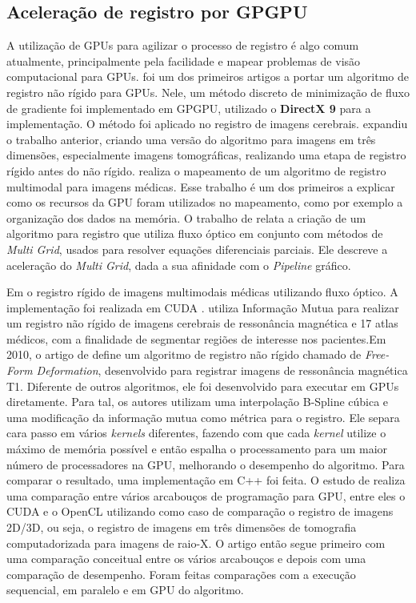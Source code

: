 \subsection{Aceleração de registro por GPGPU}

  A utilização de GPUs para agilizar o processo de registro é algo comum
atualmente, principalmente pela facilidade e mapear problemas de visão
computacional para GPUs. \cite{strzodka2004image} foi um dos primeiros artigos
a portar um algoritmo de registro não rígido para GPUs. Nele, um método discreto
de minimização de fluxo de gradiente foi implementado em GPGPU, utilizado o
\textbf{DirectX 9} para a implementação. O método foi aplicado no registro
de imagens cerebrais. \cite{kohn2006gpu} expandiu o trabalho
anterior, criando uma versão do algoritmo para imagens em três dimensões, 
especialmente imagens tomográficas, realizando uma etapa de registro rígido antes 
do não rígido. \cite{vetter2007non} realiza o mapeamento de um algoritmo de 
registro multimodal para imagens médicas. Esse trabalho é um dos primeiros a 
explicar como os recursos da GPU foram utilizados no mapeamento, como por 
exemplo a organização dos dados na memória. O trabalho de \cite{grossauer2008gpu} 
relata a criação de um algoritmo para registro que utiliza fluxo óptico em conjunto 
com métodos de \textit{Multi Grid}, usados para resolver equações diferenciais 
parciais. Ele descreve a aceleração do \textit{Multi Grid}, dada a sua 
afinidade com o \textit{Pipeline} gráfico.

  Em \cite{bui2009performance} o registro rígido de imagens multimodais médicas
utilizando fluxo óptico. A implementação foi realizada em CUDA
\cite{nvidia2007compute}. \cite{han2009gpu} utiliza Informação Mutua para
realizar um registro não rígido de imagens cerebrais de ressonância magnética
e 17 atlas médicos, com a finalidade de segmentar regiões de interesse nos
pacientes.Em 2010, o artigo de \cite{modat2010fast} define um algoritmo de
registro não rígido chamado de \textit{Free-Form Deformation}, desenvolvido
para registrar imagens de ressonância magnética T1. Diferente de outros
algoritmos, ele foi desenvolvido para executar em GPUs diretamente. Para tal,
os autores utilizam uma interpolação B-Spline cúbica e uma modificação da
informação mutua como métrica para o registro. Ele separa cara passo em vários
\textit{kernels} diferentes, fazendo com que cada \textit{kernel} utilize o
máximo de memória possível e então espalha o processamento para um maior número
de processadores na GPU, melhorando o desempenho do algoritmo. Para comparar o
resultado, uma implementação em C++ foi feita. O estudo de
\cite{membarth2011frameworks} realiza uma comparação entre vários arcabouços de
programação para GPU, entre eles o CUDA e o OpenCL utilizando como caso de
comparação o registro de imagens 2D/3D, ou seja, o registro de imagens em três
dimensões de tomografia computadorizada para imagens de raio-X. O artigo então
segue primeiro com uma comparação conceitual entre os vários arcabouços e
depois com uma comparação de desempenho. Foram feitas comparações com a
execução sequencial, em paralelo e em GPU do algoritmo.

